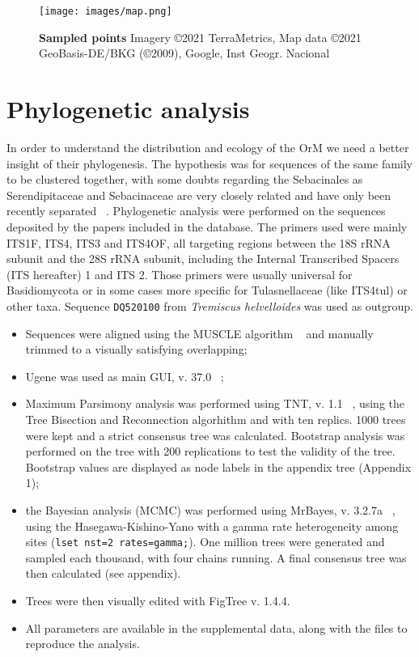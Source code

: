 \begin{figure}[htbp]
\centering
\texttt{[image: images/map.png]}
\caption{\textbf{Sampled points} \textbar{} Imagery ©2021 TerraMetrics, Map data ©2021 GeoBasis-DE\slash BKG (©2009), Google, Inst Geogr. Nacional}
\end{figure}

\chapter{Phylogenetic analysis}
\label{phylogeneticanalysis}

In order to understand the distribution and ecology of the OrM we need a better insight of their phylogenesis. The hypothesis was for sequences of the same family to be clustered together, with some doubts regarding the Sebacinales as Serendipitaceae and Sebacinaceae are very closely related and have only been recently separated ~\citep{weiss2016}.
Phylogenetic analysis were performed on the sequences deposited by the papers included in the database.
The primers used were mainly ITS1F, ITS4, ITS3 and ITS4OF, all targeting regions between the 18S rRNA subunit and the 28S rRNA subunit, including the Internal Transcribed Spacers (ITS hereafter) 1 and ITS 2. Those primers were usually universal for Basidiomycota or in some cases more specific for Tulasnellaceae (like ITS4tul) or other taxa.
Sequence \texttt{DQ520100} from \emph{Tremiscus helvelloides} was used as outgroup.

\begin{itemize}
\item Sequences were aligned using the MUSCLE algorithm ~\citep{edgar2004} and manually trimmed to a visually satisfying overlapping;

\item Ugene was used as main GUI, v. 37.0 ~\citep{okonechnikov2012};

\item Maximum Parsimony analysis was performed using TNT, v. 1.1 ~\citep{tnt}, using the Tree Bisection and Reconnection algorhithm and with ten replics. 1000 trees were kept and a strict consensus tree was calculated. Bootstrap analysis was performed on the tree with 200 replications to test the validity of the tree. Bootstrap values are displayed as node labels in the appendix tree (Appendix 1);

\item the Bayesian analysis (MCMC) was performed using MrBayes, v. 3.2.7a ~\citep{huelsenbeck2001}, using the Hasegawa-Kishino-Yano with a gamma rate heterogeneity among sites (\texttt{lset nst=2 rates=gamma;}). One million trees were generated and sampled each thousand, with four chains running. A final consensus tree was then calculated (see appendix).

\item Trees were then visually edited with FigTree v. 1.4.4.

\item All parameters are available in the supplemental data, along with the files to reproduce the analysis.

\end{itemize}


